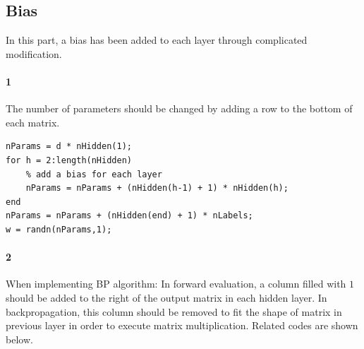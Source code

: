 \documentclass{article}
\begin{document}
\subsection{Bias}

In this part, a bias has been added to each layer through complicated modification.

\paragraph{1}
The number of parameters should be changed by adding a row to the bottom of each matrix.

\begin{lstlisting}
nParams = d * nHidden(1);
for h = 2:length(nHidden)
    % add a bias for each layer
    nParams = nParams + (nHidden(h-1) + 1) * nHidden(h);
end
nParams = nParams + (nHidden(end) + 1) * nLabels;
w = randn(nParams,1);
\end{lstlisting}

\paragraph{2}
When implementing BP algorithm: In forward evaluation, a column filled with $1$ should be added to the right of the output matrix in each hidden layer. In backpropagation, this column should be removed to fit the shape of matrix in previous layer in order to execute matrix multiplication. Related codes are shown below.
\end{document}
